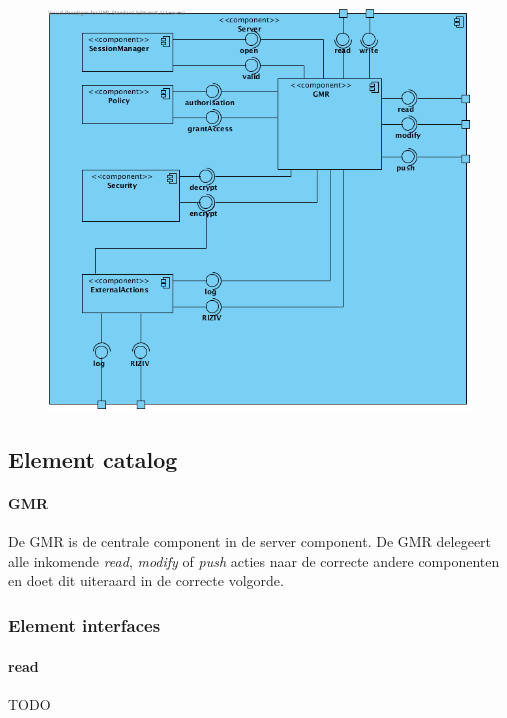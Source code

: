 \documentclass[a4paper,10pt]{paper}
\begin{document}
\begin{center}
    \begin{figure}
      \includegraphics[width=\textwidth]{../images/ClientServer_Server.png}
    \end{figure}
  \end{center}

\subsection{Element catalog}

\paragraph{GMR}
De GMR is de centrale component in de server component.  De GMR delegeert alle inkomende \textit{read}, \textit{modify} of \textit{push} acties naar de correcte andere componenten en doet dit uiteraard in de correcte volgorde.

\subsubsection{Element interfaces} 

\paragraph{read}
TODO
\end{document}
